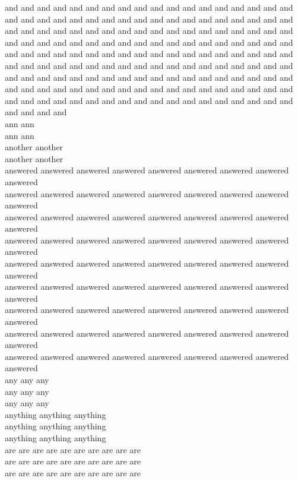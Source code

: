 and and and and and and and and and and and and and and and and and and and and and and and and and and and and and and and and and and and and and and and and and and and and and and and and and and and and and and and and and and and and and and and and and and and and and and and and and and and and and and and and and and and and and and and and and and and and and and and and and and and and and and and and and and and and and and and and and and and and and and and and and and and and and and and and and and and and and and and and and and and and and and and and and and and and and and and and and and and and and and and and and and and and and and\\
ann ann\\
ann ann\\
another another\\
another another\\
answered answered answered answered answered answered answered answered answered\\
answered answered answered answered answered answered answered answered answered\\
answered answered answered answered answered answered answered answered answered\\
answered answered answered answered answered answered answered answered answered\\
answered answered answered answered answered answered answered answered answered\\
answered answered answered answered answered answered answered answered answered\\
answered answered answered answered answered answered answered answered answered\\
answered answered answered answered answered answered answered answered answered\\
answered answered answered answered answered answered answered answered answered\\
any any any\\
any any any\\
any any any\\
anything anything anything\\
anything anything anything\\
anything anything anything\\
are are are are are are are are are are\\
are are are are are are are are are are\\
are are are are are are are are are are\\
